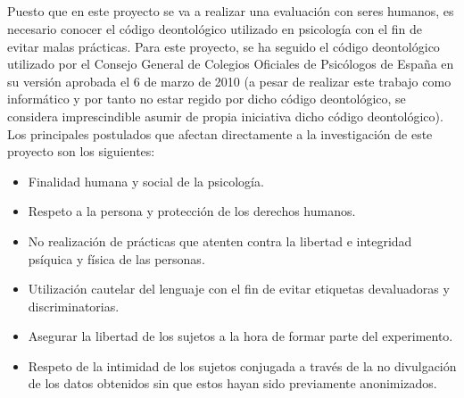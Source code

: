 \subparagraph{}
Puesto que en este proyecto se va a realizar una evaluación con seres humanos, es necesario conocer el código deontológico utilizado en psicología con el fin de evitar malas prácticas. Para este proyecto, se ha seguido el código deontológico utilizado por el Consejo General de Colegios Oficiales de Psicólogos de España en su versión aprobada el 6 de marzo de 2010 (a pesar de realizar este trabajo como informático y por tanto no estar regido por dicho código deontológico, se considera imprescindible asumir de propia iniciativa dicho código deontológico). Los principales postulados que afectan directamente a la investigación de este proyecto son los siguientes:
\begin{itemize}
    \item Finalidad humana y social de la psicología.
    \item Respeto a la persona y protección de los derechos humanos.
    \item No realización de prácticas que atenten contra la libertad e integridad psíquica y física de las personas.
    \item Utilización cautelar del lenguaje con el fin de evitar etiquetas devaluadoras y discriminatorias.
    \item Asegurar la libertad de los sujetos a la hora de formar parte del experimento.
    \item Respeto de la intimidad de los sujetos conjugada a través de la no divulgación de los datos obtenidos sin que estos hayan sido previamente anonimizados.
\end{itemize}